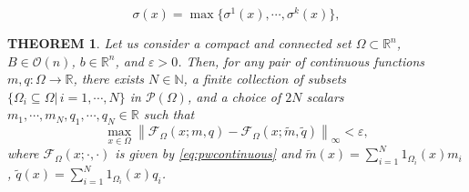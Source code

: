 \documentclass[10pt,a4paper]{amsart}
\newtheorem{theorem}{THEOREM}
\newcommand{\R}{\mathbb{R}}
\begin{document}
\begin{equation}\label{eq:pwl}
\sigma(x) = \max\{\sigma^1(x),\cdots,\sigma^k(x)\},
\end{equation}

\begin{theorem}\label{thm:density}
Let us consider a compact and connected set $\Omega\subset\R^n$, $B\in\mathcal{O}(n)$, $b\in\R^n$, and $\varepsilon>0$. Then, for any pair of continuous functions $m,q:\Omega\to\R$, there exists $N\in\mathbb{N}$, a finite collection of subsets $\{\Omega_i\subseteq\Omega|\,i=1,\cdots,N\}$ in $\mathcal{P}(\Omega)$, and a choice of $2N$ scalars $m_1,\cdots,m_N,q_1,\cdots,q_N\in\R$ such that
\[
\max_{x\in\Omega}\left\|\mathcal{F}_\Omega(x; m, q) - \mathcal{F}_\Omega(x; \widetilde{m}, \widetilde{q})\right\|_{\infty} < \varepsilon,
\]
where $\mathcal{F}_\Omega(x; \cdot, \cdot)$ is given by \eqref{eq:pwcontinuous} and $\widetilde{m}(x) = \sum_{i=1}^N 1_{\Omega_i}(x)m_i$, $\widetilde{q}(x) = \sum_{i=1}^N 1_{\Omega_i}(x)q_i$.
\end{theorem}
\end{document}
